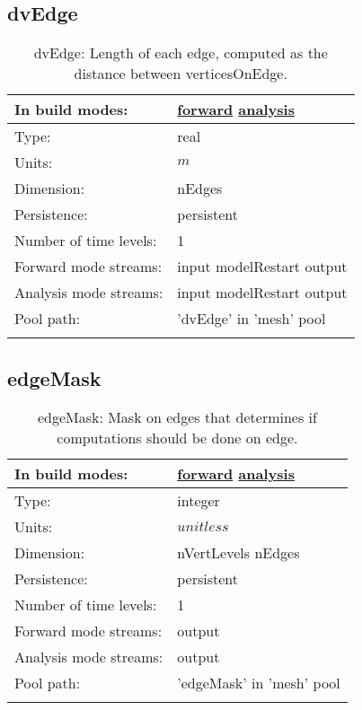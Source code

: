 \subsection[dvEdge]{dvEdge}
\label{subsec:var_sec_mesh_dvEdge}
\begin{center}
\begin{longtable}{| p{2.0in} | p{4.0in} |}
        \hline 
        In build modes: & \hyperref[subsec:forward_var_tab_mesh]{forward} \hyperref[subsec:analysis_var_tab_mesh]{analysis} \\
        \hline 
        Type: & real \\
        \hline 
        Units: & $m$ \\
        \hline 
        Dimension: & nEdges \\
        \hline 
        Persistence: & persistent \\
        \hline 
        Number of time levels: & 1 \\
        \hline 
		 Forward mode streams: &  input modelRestart output \\
        \hline 
		 Analysis mode streams: &  input modelRestart output \\
        \hline 
            Pool path: & 'dvEdge' in 'mesh' pool
 \\
		 \hline 
    \caption{dvEdge: Length of each edge, computed as the distance between verticesOnEdge.}
\end{longtable}
\end{center}
\subsection[edgeMask]{edgeMask}
\label{subsec:var_sec_mesh_edgeMask}
\begin{center}
\begin{longtable}{| p{2.0in} | p{4.0in} |}
        \hline 
        In build modes: & \hyperref[subsec:forward_var_tab_mesh]{forward} \hyperref[subsec:analysis_var_tab_mesh]{analysis} \\
        \hline 
        Type: & integer \\
        \hline 
        Units: & $unitless$ \\
        \hline 
        Dimension: & nVertLevels nEdges \\
        \hline 
        Persistence: & persistent \\
        \hline 
        Number of time levels: & 1 \\
        \hline 
		 Forward mode streams: &  output \\
        \hline 
		 Analysis mode streams: &  output \\
        \hline 
            Pool path: & 'edgeMask' in 'mesh' pool
 \\
		 \hline 
    \caption{edgeMask: Mask on edges that determines if computations should be done on edge.}
\end{longtable}
\end{center}
